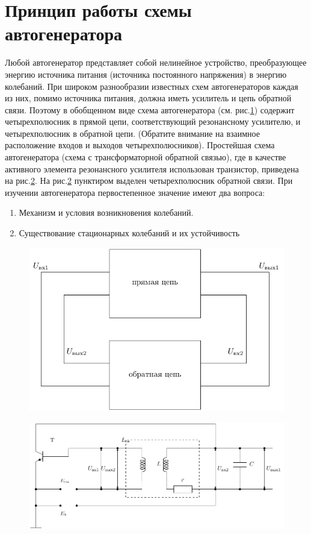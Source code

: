 \section{Принцип работы схемы автогенератора}
Любой автогенератор представляет собой нелинейное устройство, преобразующее энергию источника питания (источника постоянного напряжения) в энергию колебаний. При широком разнообразии известных схем автогенераторов каждая из них, помимо источника питания, должна иметь усилитель и цепь обратной связи. Поэтому в обобщенном виде схема автогенератора (см. рис.\ref{fig:figure1}) содержит четырехполюсник в прямой цепи, соответствующий резонансному усилителю, и четырехполюсник в обратной цепи. (Обратите внимание на взаимное расположение входов и выходов четырехполюсников).
Простейшая схема автогенератора (схема с трансформаторной обратной связью), где в качестве активного элемента резонансного усилителя использован транзистор, приведена на рис.\ref{fig:figure2}. На рис.\ref{fig:figure2} пунктиром выделен четырехполюсник обратной связи.
При изучении автогенератора первостепенное значение имеют два вопроса:
\begin{enumerate}
\item Механизм и условия возникновения колебаний.
\item Существование стационарных колебаний и их устойчивость
\end{enumerate}
\begin{figure}[h]
	\centering
	\includegraphics[width=\linewidth]{circuit/one.pdf}
	\caption{}
	\label{fig:figure1}
\end{figure}
\begin{figure}[h]
	\centering
	\includegraphics[width=\linewidth]{circuit/Draft6.pdf}
	\caption{}
	\label{fig:figure2}
\end{figure}
